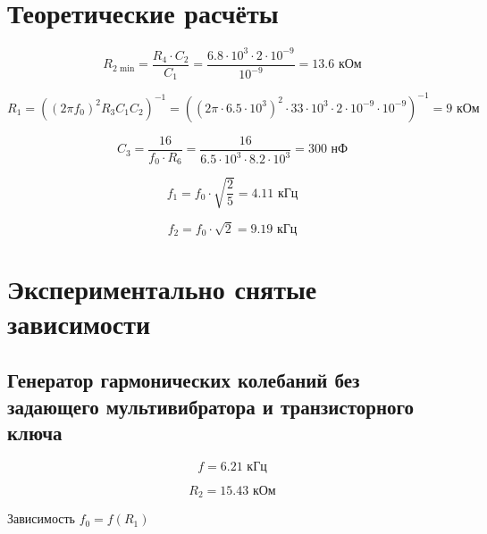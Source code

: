 \section{Теоретические расчёты}

\begin{equation}
\label{eq:4:1}
	R_\text{2 min} = \frac{R_4 \cdot C_2}{C_1} = \frac{6.8 \cdot 10^3 \cdot 2 \cdot 10^{-9}}{10^{-9}} = 13.6 \text{ кОм}
\end{equation}

\begin{equation}
	R_1 = \left((2\pi f_0)^2 R_3 C_1 C_2 \right)^{-1} = \left((2\pi \cdot 6.5 \cdot 10^3)^2 \cdot 33 \cdot 10^3 \cdot 2 \cdot 10^{-9} \cdot 10^{-9} \right)^{-1} = 9 \text{ кОм}
\end{equation}

\begin{equation}
	C_3 = \frac{16}{f_0 \cdot R_6} = \frac{16}{6.5 \cdot 10^3 \cdot 8.2 \cdot 10^3} = 300 \text{ нФ}
\end{equation}

\begin{equation}
	f_1 = f_0 \cdot \sqrt{\frac{2}{5}} = 4.11 \text{ кГц}
\end{equation}

\begin{equation}
\label{eq:4:5}
	f_2 = f_0 \cdot \sqrt{2} = 9.19 \text{ кГц}
\end{equation}

\section{Экспериментально снятые зависимости}

\subsection{Генератор гармонических колебаний без задающего мультивибратора и транзисторного ключа}

\begin{displaymath}
	f = 6.21 \text{ кГц}
\end{displaymath}

\begin{displaymath}
	R_2 = 15.43 \text{ кОм}
\end{displaymath}


\begin{table}[H]
\begin{center}
	\caption{Зависимость $f_0 = f(R_1)$}
	\label{tab:diff-int}
	\def\tabcolsep{20pt}
\end{center}
\end{table}

